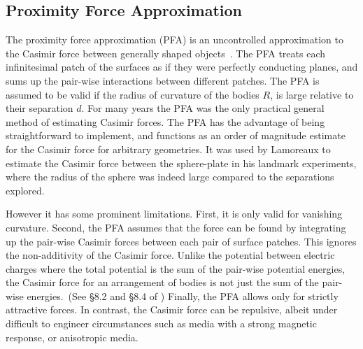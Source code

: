 
\subsection{Proximity Force Approximation}

The proximity force approximation (PFA) is an uncontrolled approximation to
the Casimir force between generally shaped objects~\cite{Derjaguin1956}.  
The PFA treats each infinitesimal patch of the surfaces as if they were perfectly conducting planes,
and sums up the pair-wise interactions between different patches.
The PFA is assumed to be valid if the radius of curvature of the bodies $R$, is large relative to 
their separation $d$.  
For many years the PFA was the only practical general method of estimating Casimir forces.
The PFA has the advantage of being straightforward to implement, and functions as an order of magnitude
estimate for the Casimir force for arbitrary geometries.
It was used by Lamoreaux to estimate the Casimir force between the sphere-plate
in his landmark experiments, where the radius of the sphere was indeed large compared to the separations explored. 

However it has some prominent limitations.
First, it is only valid for vanishing curvature.
Second, the PFA assumes that the force can be found by integrating up
the pair-wise Casimir forces between each pair of surface patches.  This ignores the non-additivity
of the Casimir force.  Unlike the potential between electric charges where the total potential is
the sum of the pair-wise potential energies, the Casimir force for an arrangement
of bodies is not just the sum of the pair-wise energies.~(See \S{8.2} and \S{8.4} of \cite{Milonni1994})
Finally, the PFA allows only for strictly attractive forces.  
In contrast, the Casimir force can be repulsive, albeit under difficult to engineer circumstances 
such as media with a strong magnetic response, or anisotropic media.

